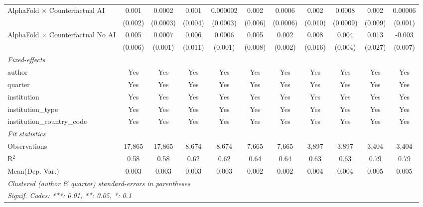 \begin{tabular}{lcccccccccc}
   AlphaFold $\times$ Counterfactual AI     & 0.001   & 0.0002   & 0.001   & 0.000002 & 0.002   & 0.0006   & 0.002   & 0.0008   & 0.002   & 0.00006\\   
                                            & (0.002) & (0.0003) & (0.004) & (0.0003) & (0.006) & (0.0006) & (0.010) & (0.0009) & (0.009) & (0.001)\\   
   AlphaFold $\times$ Counterfactual No AI  & 0.005   & 0.0007   & 0.006   & 0.0006   & 0.005   & 0.002    & 0.008   & 0.004    & 0.013   & -0.003\\   
                                            & (0.006) & (0.001)  & (0.011) & (0.001)  & (0.008) & (0.002)  & (0.016) & (0.004)  & (0.027) & (0.007)\\   
   \midrule
   \emph{Fixed-effects}\\
   author                                   & Yes     & Yes      & Yes     & Yes      & Yes     & Yes      & Yes     & Yes      & Yes     & Yes\\  
   quarter                                  & Yes     & Yes      & Yes     & Yes      & Yes     & Yes      & Yes     & Yes      & Yes     & Yes\\  
   institution                              & Yes     & Yes      & Yes     & Yes      & Yes     & Yes      & Yes     & Yes      & Yes     & Yes\\  
   institution\_type                        & Yes     & Yes      & Yes     & Yes      & Yes     & Yes      & Yes     & Yes      & Yes     & Yes\\  
   institution\_country\_code               & Yes     & Yes      & Yes     & Yes      & Yes     & Yes      & Yes     & Yes      & Yes     & Yes\\  
   \midrule
   \emph{Fit statistics}\\
   Observations                             & 17,865  & 17,865   & 8,674   & 8,674    & 7,665   & 7,665    & 3,897   & 3,897    & 3,404   & 3,404\\  
   R$^2$                                    & 0.58    & 0.58     & 0.62    & 0.62     & 0.64    & 0.64     & 0.63    & 0.63     & 0.79    & 0.79\\  
Mean(Dep. Var.) & 0.003 & 0.003 & 0.003 & 0.003 & 0.002 & 0.002 & 0.004 & 0.004 & 0.005 & 0.005 \\
   \midrule \midrule
   \multicolumn{11}{l}{\emph{Clustered (author \& quarter) standard-errors in parentheses}}\\
   \multicolumn{11}{l}{\emph{Signif. Codes: ***: 0.01, **: 0.05, *: 0.1}}\\
\end{tabular}
\par\endgroup
